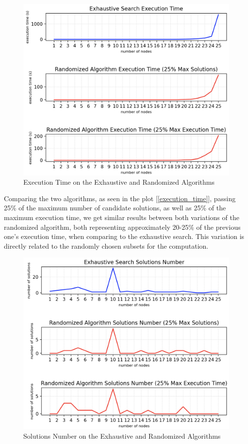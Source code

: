 \documentclass[...]{revdetua}
\begin{document}
\begin{figure}[!htbp]
    \centering
    \includegraphics[width=0.9\columnwidth]{./figures/execution_time_0.25.png}
    \caption{Execution Time on the Exhaustive and Randomized Algorithms\label{execution_time}}
    \label{fig: Execution Time on the Exhaustive and Randomized Algorithms}
\end{figure}

Comparing the two algorithms, as seen in the plot [\ref{execution_time}], passing 25\% of the maximum number of candidate solutions, as well as 25\% of the maximum execution time, we get similar results between both variations of the randomized algorithm, both representing approximately 20-25\% of the previous one's execution time, when comparing to the exhaustive search. This variation is directly related to the randomly chosen subsets for the computation.

\begin{figure}[!htbp]
    \centering
    \includegraphics[width=0.9\columnwidth]{./figures/solutions_number_0.25.png}
    \caption{Solutions Number on the Exhaustive and Randomized Algorithms\label{solutions_number}}
    \label{fig: Solutions Number on the Exhaustive and Randomized Algorithms}
\end{figure}
\end{document}
